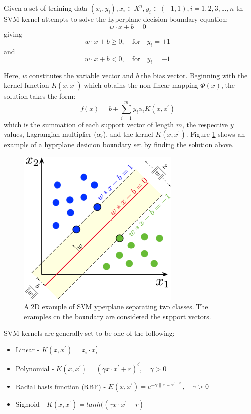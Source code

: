 \documentclass[fleqn,twoside]{article}
\begin{document}
Given a set of training data {$(x_i, y_i), x_i \in X^n, y_i \in (-1,1), i = 1,2,3,...,n$} th SVM kernel attempts to solve the hyperplane decision boundary equation:
\begin{equation}
w \cdot x + b = 0
\end{equation} 
giving
\begin{equation}
w \cdot x + b \geq 0, \quad \textrm{for} \quad y_i = +1
\end{equation}
and
\begin{equation}
w \cdot x + b < 0, \quad \textrm{for} \quad y_i = -1
\end{equation}

Here, $w$ constitutes the variable vector and $b$ the bias vector. Beginning with the kernel function $K(x, x^\prime)$ which obtains the non-linear mapping $\Phi(x)$, the solution takes the form:
\begin{equation}
f(x) = b + \sum_{i=1}^{m} y_i \alpha_i K(x, x^\prime)
\end{equation}
which is the summation of each support vector of length $m$, the respective $y$ values, Lagrangian multiplier ($\alpha_i$), and the kernel $K(x, x^\prime)$. Figure \ref{fig:SVM} shows an example of a hyprplane desicion boundary set by finding the solution above.

\begin{figure}[h]
	\centering
	\includegraphics[width=0.5\linewidth]{SVM.png}
	\caption{A 2D example of SVM yperplane separating two classes. The examples on the boundary are considered the support vectors.}
	\label{fig:SVM}
\end{figure}%

SVM kernels are generally set to be one of the following:

\begin{itemize}
	\item Linear - $K(x, x^\prime) = x_i \cdot x_i^\prime$
	\item Polynomial - $K(x, x^\prime) = (\gamma x \cdot x^\prime + r) ^d, \quad \gamma > 0 \quad$
	\item Radial basis function (RBF) - $K(x, x^\prime) = e^{-\gamma\|x-x^\prime\|^2},  \quad \gamma > 0 \quad$
	\item Sigmoid - $K(x, x^\prime) = tanh((\gamma x \cdot x^\prime + r)$
\end{itemize}
\end{document}
